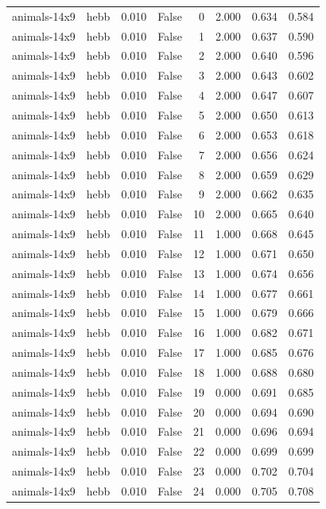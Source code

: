 \begin{tabular}{llrrrrrr}
animals-14x9 & hebb & 0.010 & False & 0 & 2.000 & 0.634 & 0.584 \\
animals-14x9 & hebb & 0.010 & False & 1 & 2.000 & 0.637 & 0.590 \\
animals-14x9 & hebb & 0.010 & False & 2 & 2.000 & 0.640 & 0.596 \\
animals-14x9 & hebb & 0.010 & False & 3 & 2.000 & 0.643 & 0.602 \\
animals-14x9 & hebb & 0.010 & False & 4 & 2.000 & 0.647 & 0.607 \\
animals-14x9 & hebb & 0.010 & False & 5 & 2.000 & 0.650 & 0.613 \\
animals-14x9 & hebb & 0.010 & False & 6 & 2.000 & 0.653 & 0.618 \\
animals-14x9 & hebb & 0.010 & False & 7 & 2.000 & 0.656 & 0.624 \\
animals-14x9 & hebb & 0.010 & False & 8 & 2.000 & 0.659 & 0.629 \\
animals-14x9 & hebb & 0.010 & False & 9 & 2.000 & 0.662 & 0.635 \\
animals-14x9 & hebb & 0.010 & False & 10 & 2.000 & 0.665 & 0.640 \\
animals-14x9 & hebb & 0.010 & False & 11 & 1.000 & 0.668 & 0.645 \\
animals-14x9 & hebb & 0.010 & False & 12 & 1.000 & 0.671 & 0.650 \\
animals-14x9 & hebb & 0.010 & False & 13 & 1.000 & 0.674 & 0.656 \\
animals-14x9 & hebb & 0.010 & False & 14 & 1.000 & 0.677 & 0.661 \\
animals-14x9 & hebb & 0.010 & False & 15 & 1.000 & 0.679 & 0.666 \\
animals-14x9 & hebb & 0.010 & False & 16 & 1.000 & 0.682 & 0.671 \\
animals-14x9 & hebb & 0.010 & False & 17 & 1.000 & 0.685 & 0.676 \\
animals-14x9 & hebb & 0.010 & False & 18 & 1.000 & 0.688 & 0.680 \\
animals-14x9 & hebb & 0.010 & False & 19 & 0.000 & 0.691 & 0.685 \\
animals-14x9 & hebb & 0.010 & False & 20 & 0.000 & 0.694 & 0.690 \\
animals-14x9 & hebb & 0.010 & False & 21 & 0.000 & 0.696 & 0.694 \\
animals-14x9 & hebb & 0.010 & False & 22 & 0.000 & 0.699 & 0.699 \\
animals-14x9 & hebb & 0.010 & False & 23 & 0.000 & 0.702 & 0.704 \\
animals-14x9 & hebb & 0.010 & False & 24 & 0.000 & 0.705 & 0.708 \\

\end{tabular}
